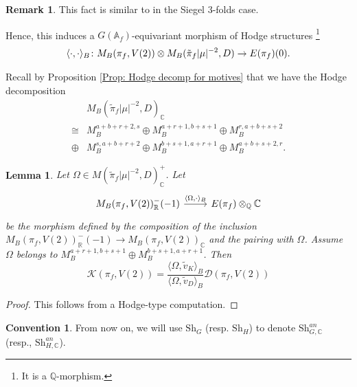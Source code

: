 \documentclass[11pt, a4paper]{amsart}
\theoremstyle{plain}
\newtheorem{lemma}[theorem]{Lemma}
\theoremstyle{definition}
\newtheorem{remark}[theorem]{Remark}
\newtheorem{convention}[theorem]{Convention}
\numberwithin{equation}{section}
\def\AAA{\mathbb{A}}
\def\CC{\mathbb{C}}
\def\QQ{\mathbb{Q}}
\def\RR{\mathbb{R}}
\newcommand{\Sh}{\mathrm{Sh}}
\begin{document}
\begin{remark}
    This fact is similar to \cite[p295]{Taylor93} in the Siegel 3-folds case.
\end{remark}
Hence, this induces a $G(\AAA_f)$-equivariant morphism of Hodge structures \footnote{It is a $\QQ$-morphism.}
\begin{equation}
\label{eq: M_{B} pairing}
    \langle \cdot, \cdot \rangle_{B} \colon M_{B}(\pi_f, V(2)) \otimes M_B(\tilde{\pi}_f|\mu|^{-2}, D) \rightarrow E(\pi_f)(0). 
\end{equation}

Recall by Proposition \ref{Prop: Hodge decomp for motives} that we have the Hodge decomposition
\begin{align*}
    & M_{B}(\tilde{\pi}_f|\mu|^{-2}, D)_{\CC} \\
    \cong & M_{B}^{a + b + r + 2, s} \oplus M_{B}^{a + r + 1, b + s + 1} \oplus M_{B}^{r, a + b + s + 2} \\
    \oplus & M_{B}^{s, a + b + r + 2} \oplus M_{B}^{b + s + 1, a + r + 1} \oplus M_{B}^{a + b + s + 2, r}. 
\end{align*}

\begin{lemma}
\label{lemma: abstrac paring with Omega}
    Let $\Omega \in M(\tilde{\pi}_f|\mu|^{-2}, D)_{\CC}^{+}$. Let 
    \[
        \begin{tikzcd}
            M_{B}(\pi_f, V(2))^{-}_{\RR}(-1) \ar[r, "{\langle\Omega, \cdot \rangle_{B}}"] & E(\pi_f) \otimes_{\QQ} \CC 
        \end{tikzcd}
    \]
    be the morphism defined by the composition of the inclusion $M_{B}(\pi_f, V(2))^{-}_{\RR}(-1) \rightarrow M_{B}(\pi_f, V(2))_{\CC}$ and the pairing with $\Omega$. Assume $\Omega$ belongs to $M_{B}^{a + r + 1, b + s + 1} \oplus M_{B}^{b + s + 1, a + r + 1}$. Then 
    \begin{equation}
    \label{eq:comparion_rat_struc}
        \mathcal{K}(\pi_{f}, V(2)) = \frac{\langle \Omega, \tilde{v}_{K} \rangle_{B}}{\langle \Omega, \tilde{v}_{D} \rangle_{B}} \mathcal{D}(\pi_f, V(2))
    \end{equation}
\end{lemma}

\begin{proof}
    This follows from a Hodge-type computation. 
\end{proof}

\begin{convention}
    From now on, we will use $\Sh_{G}$ (resp. $\Sh_{H}$) to denote $\Sh_{G, \CC}^{an}$ (resp., $\Sh_{H, \CC}^{an}$). 
\end{convention}
\end{document}
